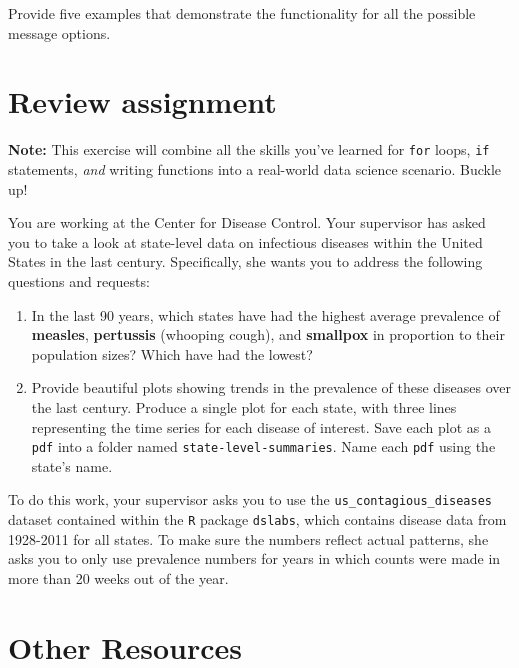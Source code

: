 \documentclass[
]{book}
\begin{document}
Provide five examples that demonstrate the functionality for all the possible message options.

\hypertarget{review-assignment-9}{%
\section*{Review assignment}\label{review-assignment-9}}

\textbf{Note:} This exercise will combine all the skills you've learned for \texttt{for} loops, \texttt{if} statements, \emph{and} writing functions into a real-world data science scenario. Buckle up!

You are working at the Center for Disease Control. Your supervisor has asked you to take a look at state-level data on infectious diseases within the United States in the last century. Specifically, she wants you to address the following questions and requests:

\begin{enumerate}
\def\labelenumi{\arabic{enumi}.}
\item
  In the last 90 years, which states have had the highest average prevalence of \textbf{measles}, \textbf{pertussis} (whooping cough), and \textbf{smallpox} in proportion to their population sizes? Which have had the lowest?
\item
  Provide beautiful plots showing trends in the prevalence of these diseases over the last century. Produce a single plot for each state, with three lines representing the time series for each disease of interest. Save each plot as a \texttt{pdf} into a folder named \texttt{state-level-summaries}. Name each \texttt{pdf} using the state's name.
\end{enumerate}

To do this work, your supervisor asks you to use the \texttt{us\_contagious\_diseases} dataset contained within the \texttt{R} package \texttt{dslabs}, which contains disease data from 1928-2011 for all states. To make sure the numbers reflect actual patterns, she asks you to only use prevalence numbers for years in which counts were made in more than 20 weeks out of the year.

\hypertarget{other-resources-7}{%
\section*{Other Resources}\label{other-resources-7}}
\end{document}
